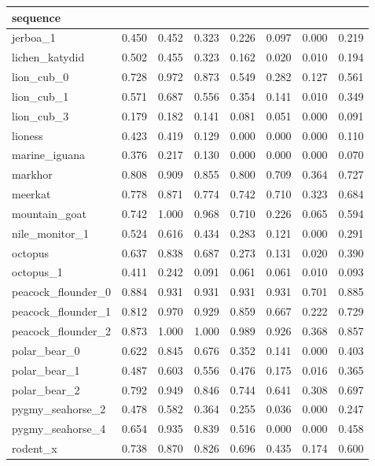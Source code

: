 \begin{table*}[]
\begin{tabular}{l|c|cccccc}
sequence &  &  &  &  &  &  &  \\ \hline
jerboa\_1 & 0.450 & 0.452 & 0.323 & 0.226 & 0.097 & 0.000 & 0.219 \\
lichen\_katydid & 0.502 & 0.455 & 0.323 & 0.162 & 0.020 & 0.010 & 0.194 \\
lion\_cub\_0 & 0.728 & 0.972 & 0.873 & 0.549 & 0.282 & 0.127 & 0.561 \\
lion\_cub\_1 & 0.571 & 0.687 & 0.556 & 0.354 & 0.141 & 0.010 & 0.349 \\ 
lion\_cub\_3 & 0.179 & 0.182 & 0.141 & 0.081 & 0.051 & 0.000 & 0.091 \\ 
lioness & 0.423 & 0.419 & 0.129 & 0.000 & 0.000 & 0.000 & 0.110 \\
marine\_iguana & 0.376 & 0.217 & 0.130 & 0.000 & 0.000 & 0.000 & 0.070 \\
markhor & 0.808 & 0.909 & 0.855 & 0.800 & 0.709 & 0.364 & 0.727 \\
meerkat & 0.778 & 0.871 & 0.774 & 0.742 & 0.710 & 0.323 & 0.684 \\
mountain\_goat & 0.742 & 1.000 & 0.968 & 0.710 & 0.226 & 0.065 & 0.594 \\
nile\_monitor\_1 & 0.524 & 0.616 & 0.434 & 0.283 & 0.121 & 0.000 & 0.291 \\
octopus & 0.637 & 0.838 & 0.687 & 0.273 & 0.131 & 0.020 & 0.390 \\
octopus\_1 & 0.411 & 0.242 & 0.091 & 0.061 & 0.061 & 0.010 & 0.093 \\
peacock\_flounder\_0 & 0.884 & 0.931 & 0.931 & 0.931 & 0.931 & 0.701 & 0.885 \\
peacock\_flounder\_1 & 0.812 & 0.970 & 0.929 & 0.859 & 0.667 & 0.222 & 0.729 \\
peacock\_flounder\_2 & 0.873 & 1.000 & 1.000 & 0.989 & 0.926 & 0.368 & 0.857 \\
polar\_bear\_0 & 0.622 & 0.845 & 0.676 & 0.352 & 0.141 & 0.000 & 0.403 \\
polar\_bear\_1 & 0.487 & 0.603 & 0.556 & 0.476 & 0.175 & 0.016 & 0.365 \\
polar\_bear\_2 & 0.792 & 0.949 & 0.846 & 0.744 & 0.641 & 0.308 & 0.697 \\
pygmy\_seahorse\_2 & 0.478 & 0.582 & 0.364 & 0.255 & 0.036 & 0.000 & 0.247 \\
pygmy\_seahorse\_4 & 0.654 & 0.935 & 0.839 & 0.516 & 0.000 & 0.000 & 0.458 \\
rodent\_x & 0.738 & 0.870 & 0.826 & 0.696 & 0.435 & 0.174 & 0.600 \\

\end{tabular}
\end{table*}
